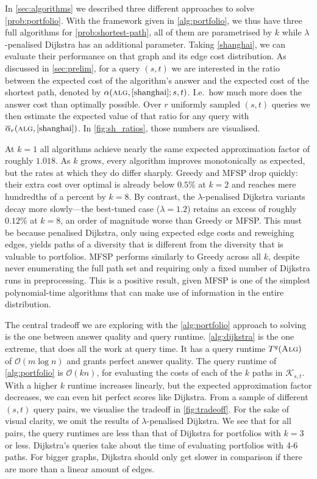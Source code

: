 In \cref{sec:algorithms} we described three different approaches to solve \cref{prob:portfolio}. With the framework given in \cref{alg:portfolio}, we thus have three full algorithms for \cref{prob:shortest-path}, all of them are parametrised by $k$ while $\lambda$-penalised Dijkstra has an additional parameter.
Taking \cref{shanghai}, we can evaluate their performance on that graph and its edge cost distribution. As discussed in \cref{sec:prelim}, for a query $(s,t)$ we are interested in the ratio between the expected cost of the algorithm's answer and the expected cost of the shortest path, denoted by $\alpha(\textsc{alg}, \cref{shanghai}; s, t)$. I.e.~how much more does the answer cost than optimally possible. Over $r$ uniformly sampled $(s,t)$ queries we then estimate the expected value of that ratio for any query with $\overline\alpha_r(\textsc{alg}, \cref{shanghai})$. In \cref{fig:sh_ratios}, those numbers are visualised.

At $k=1$ all algorithms achieve nearly the same expected approximation factor of roughly $1.018$. As $k$ grows, every algorithm improves monotonically as expected, but the rates at which they do differ sharply. Greedy and MFSP drop quickly: their extra cost over optimal is already below $0.5\%$ at $k=2$ and reaches mere hundredths of a percent by $k=8$. By contrast, the $\lambda$-penalised Dijkstra variants decay more slowly---the best-tuned case ($\lambda=1.2$) retains an excess of roughly $0.12\%$ at $k=8$, an order of magnitude worse than Greedy or MFSP. This must be because penalised Dijkstra, only using expected edge costs and reweighing edges, yields paths of a diversity that is different from the diversity that is valuable to portfolios. MFSP performs similarly to Greedy across all $k$, despite never enumerating the full path set and requiring only a fixed number of Dijkstra runs in preprocessing. This is a positive result, given MFSP is one of the simplest polynomial-time algorithms that can make use of information in the entire distribution.

The central tradeoff we are exploring with the \cref{alg:portfolio} approach to solving  is the one between answer quality and query runtime. \cref{alg:dijkstra} is the one extreme, that does all the work at query time. It has a query runtime $T^q(\textsc{Alg})$ of $\mathcal O(m \log n)$ and grants perfect answer quality. The query runtime  of \cref{alg:portfolio} is $\mathcal O(kn)$, for evaluating the costs of each of the $k$ paths in $\mathcal K_{s,t}$. With a higher $k$ runtime increases linearly, but the expected approximation factor decreases, we can even hit perfect scores like Dijkstra. From a sample of different $(s,t)$ query pairs, we visualise the tradeoff in \cref{fig:tradeoff}. For the sake of visual clarity, we omit the results of $\lambda$-penalised Dijkstra.
We see that for all pairs, the query runtimes are less than that of Dijkstra for portfolios with $k = 3$ or less. Dijkstra's queries take about the time of evaluating portfolios with 4-6 paths. For bigger graphs, Dijkstra should only get slower in comparison if there are more than a linear amount of edges.

